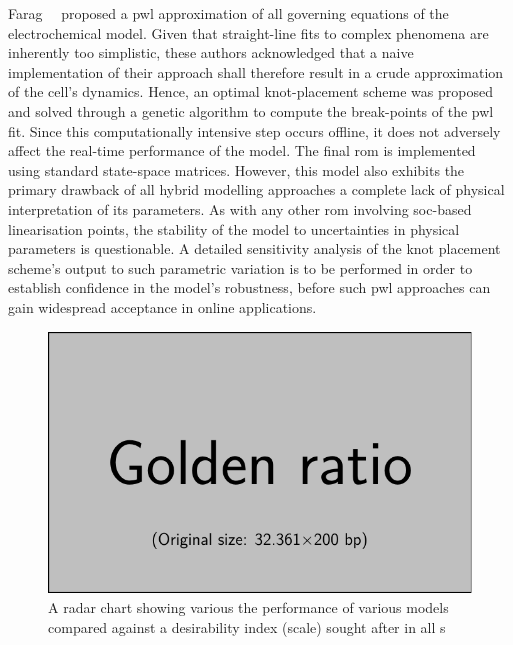 Farag~\etal{}~\cite{Farag2017}  proposed   a  \gls{pwl}  approximation   of  all
governing equations of the electrochemical  model. Given that straight-line fits
to complex phenomena  are inherently too simplistic,  these authors acknowledged
that a naive implementation of their  approach shall therefore result in a crude
approximation of  the cell's dynamics.  Hence, an optimal  knot-placement scheme
was proposed and solved through a  genetic algorithm to compute the break-points
of the \gls{pwl} fit. Since  this computationally intensive step occurs offline,
it does not  adversely affect the real-time performance of  the model. The final
\gls{rom}  is implemented  using  standard state-space  matrices. However,  this
model  also exhibits  the primary  drawback of  all hybrid  modelling approaches
\ie{} a complete lack of physical  interpretation of its parameters. As with any
other \gls{rom} involving \gls{soc}-based linearisation points, the stability of
the model  to uncertainties in  physical parameters is questionable.  A detailed
sensitivity analysis  of the knot  placement scheme's output to  such parametric
variation is  to be performed  in order to  establish confidence in  the model's
robustness, before such  \gls{pwl} approaches can gain  widespread acceptance in
online applications.




\begin{figure}[!htbp]
    \centering
    \includegraphics{placeholder_images/example-image-golden.pdf}
    \caption[Desirability index of various s]{A radar chart
        showing various the performance of various models compared against a
    desirability index (scale) sought after in all s}
    \label{fig:spiderdiagram}
\end{figure}


